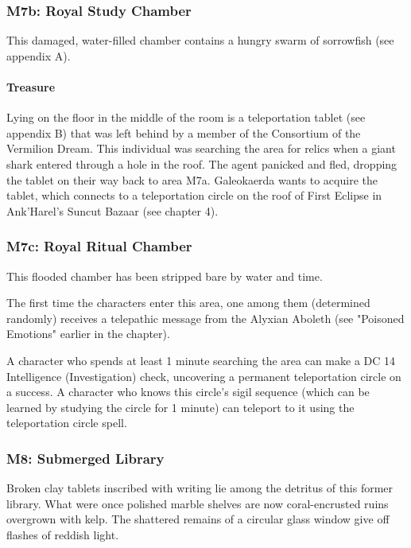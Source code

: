 \documentclass[10pt,a4paper,twoside,bg=print,twocolumn,openany,nodeprecatedcode]{dndbook}
\begin{document}
\subsubsection{M7b: Royal Study Chamber}
This damaged, water-filled chamber contains a hungry swarm of sorrowfish (see appendix A).

\paragraph{Treasure}
Lying on the floor in the middle of the room is a teleportation tablet (see appendix B) that was left behind by a member of the Consortium of the Vermilion Dream. This individual was searching the area for relics when a giant shark entered through a hole in the roof. The agent panicked and fled, dropping the tablet on their way back to area M7a. Galeokaerda wants to acquire the tablet, which connects to a teleportation circle on the roof of First Eclipse in Ank'Harel's Suncut Bazaar (see chapter 4).

\subsubsection{M7c: Royal Ritual Chamber}
This flooded chamber has been stripped bare by water and time.

The first time the characters enter this area, one among them (determined randomly) receives a telepathic message from the Alyxian Aboleth (see "Poisoned Emotions" earlier in the chapter).

A character who spends at least 1 minute searching the area can make a DC 14 Intelligence (Investigation) check, uncovering a permanent teleportation circle on a success. A character who knows this circle's sigil sequence (which can be learned by studying the circle for 1 minute) can teleport to it using the teleportation circle spell.

\subsubsection{M8: Submerged Library}
\begin{DndReadAloud}{}
Broken clay tablets inscribed with writing lie among the detritus of this former library. What were once polished marble shelves are now coral-encrusted ruins overgrown with kelp. The shattered remains of a circular glass window give off flashes of reddish light.

\end{DndReadAloud}
\end{document}
